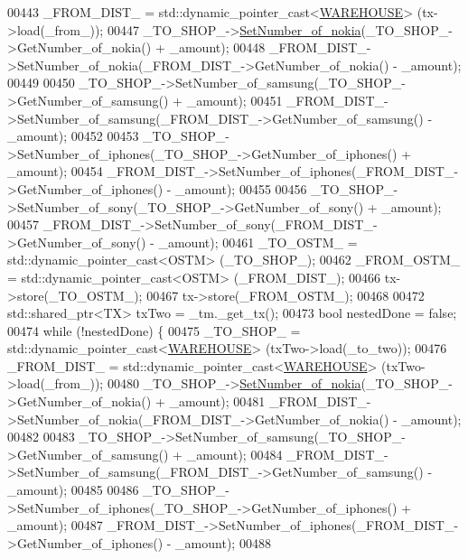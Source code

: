 \begin{DoxyCode}
00443             \_FROM\_DIST\_ = std::dynamic\_pointer\_cast<\hyperlink{class_w_a_r_e_h_o_u_s_e}{WAREHOUSE}> (tx->load(\_from\_));
00447             \_TO\_SHOP\_->\hyperlink{class_w_a_r_e_h_o_u_s_e_a13ace834a25aab61c689a7cedad94343}{SetNumber\_of\_nokia}(\_TO\_SHOP\_->GetNumber\_of\_nokia() + \_amount);
00448             \_FROM\_DIST\_->SetNumber\_of\_nokia(\_FROM\_DIST\_->GetNumber\_of\_nokia() - \_amount);
00449 
00450             \_TO\_SHOP\_->SetNumber\_of\_samsung(\_TO\_SHOP\_->GetNumber\_of\_samsung() + \_amount);
00451             \_FROM\_DIST\_->SetNumber\_of\_samsung(\_FROM\_DIST\_->GetNumber\_of\_samsung() - \_amount);
00452 
00453             \_TO\_SHOP\_->SetNumber\_of\_iphones(\_TO\_SHOP\_->GetNumber\_of\_iphones() + \_amount);
00454             \_FROM\_DIST\_->SetNumber\_of\_iphones(\_FROM\_DIST\_->GetNumber\_of\_iphones() - \_amount);
00455 
00456             \_TO\_SHOP\_->SetNumber\_of\_sony(\_TO\_SHOP\_->GetNumber\_of\_sony() + \_amount);
00457             \_FROM\_DIST\_->SetNumber\_of\_sony(\_FROM\_DIST\_->GetNumber\_of\_sony() - \_amount);
00461             \_TO\_OSTM\_ = std::dynamic\_pointer\_cast<OSTM> (\_TO\_SHOP\_);
00462             \_FROM\_OSTM\_ = std::dynamic\_pointer\_cast<OSTM> (\_FROM\_DIST\_);
00466             tx->store(\_TO\_OSTM\_);
00467             tx->store(\_FROM\_OSTM\_);
00468 
00472             std::shared\_ptr<TX> txTwo = \_tm.\_get\_tx();
00473             \textcolor{keywordtype}{bool} nestedDone = \textcolor{keyword}{false};
00474             \textcolor{keywordflow}{while} (!nestedDone) \{
00475                 \_TO\_SHOP\_ = std::dynamic\_pointer\_cast<\hyperlink{class_w_a_r_e_h_o_u_s_e}{WAREHOUSE}> (txTwo->load(\_to\_two));
00476                 \_FROM\_DIST\_ = std::dynamic\_pointer\_cast<\hyperlink{class_w_a_r_e_h_o_u_s_e}{WAREHOUSE}> (txTwo->load(\_from\_));
00480                 \_TO\_SHOP\_->\hyperlink{class_w_a_r_e_h_o_u_s_e_a13ace834a25aab61c689a7cedad94343}{SetNumber\_of\_nokia}(\_TO\_SHOP\_->GetNumber\_of\_nokia() + \_amount);
00481                 \_FROM\_DIST\_->SetNumber\_of\_nokia(\_FROM\_DIST\_->GetNumber\_of\_nokia() - \_amount);
00482 
00483                 \_TO\_SHOP\_->SetNumber\_of\_samsung(\_TO\_SHOP\_->GetNumber\_of\_samsung() + \_amount);
00484                 \_FROM\_DIST\_->SetNumber\_of\_samsung(\_FROM\_DIST\_->GetNumber\_of\_samsung() - \_amount);
00485 
00486                 \_TO\_SHOP\_->SetNumber\_of\_iphones(\_TO\_SHOP\_->GetNumber\_of\_iphones() + \_amount);
00487                 \_FROM\_DIST\_->SetNumber\_of\_iphones(\_FROM\_DIST\_->GetNumber\_of\_iphones() - \_amount);
00488 

\end{DoxyCode}

